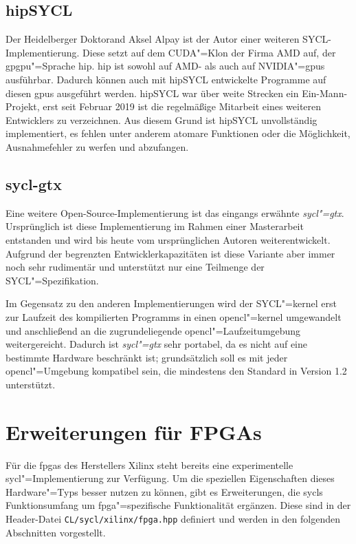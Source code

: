 \subsection{hipSYCL}

Der Heidelberger Doktorand Aksel Alpay ist der Autor einer weiteren
SYCL-Implementierung. Diese setzt auf dem CUDA"=Klon der Firma AMD auf, der
\gls{gpgpu}"=Sprache \gls{hip}. \gls{hip} ist sowohl auf AMD- als auch auf
NVIDIA"=\gls{gpu}s ausführbar. Dadurch können auch mit hipSYCL entwickelte
Programme auf diesen \gls{gpu}s ausgeführt werden. hipSYCL war über weite
Strecken ein Ein-Mann-Projekt, erst seit Februar 2019 ist die regelmäßige
Mitarbeit eines weiteren Entwicklers zu verzeichnen. Aus diesem Grund ist
hipSYCL unvollständig implementiert, es fehlen unter anderem atomare Funktionen
oder die Möglichkeit, Ausnahmefehler zu werfen und abzufangen.
\cite[vgl.][]{hipsycl}

\subsection{sycl-gtx}

Eine weitere Open-Source-Implementierung ist das eingangs erwähnte
\textit{sycl"=gtx}. Ursprünglich ist diese Implementierung im Rahmen einer
Masterarbeit entstanden \cite[vgl.][]{zuzek2016} und wird bis heute vom
ursprünglichen Autoren weiterentwickelt. Aufgrund der begrenzten
Entwicklerkapazitäten ist diese Variante aber immer noch sehr rudimentär und
unterstützt nur eine Teilmenge der SYCL"=Spezifikation.

Im Gegensatz zu den anderen Implementierungen wird der SYCL"=\gls{kernel} erst
zur Laufzeit des kompilierten Programms in einen \gls{opencl}"=\gls{kernel}
umgewandelt und anschließend an die zugrundeliegende
\gls{opencl}"=Laufzeitumgebung weitergereicht. Dadurch ist \textit{sycl"=gtx}
sehr portabel, da es nicht auf eine bestimmte Hardware beschränkt ist;
grundsätzlich soll es mit jeder \gls{opencl}"=Umgebung kompatibel sein, die
mindestens den Standard in Version 1.2 unterstützt. 
\cite[vgl.][47\psqq]{zuzek2016}

\section{Erweiterungen für FPGAs}\label{sycl:erweiterungen}

Für die \gls{fpga}s des Herstellers Xilinx steht bereits eine experimentelle
\gls{sycl}"=Implementierung zur Verfügung. Um die speziellen Eigenschaften
dieses Hardware"=Typs besser nutzen zu können, gibt es Erweiterungen, die
\gls{sycl}s Funktionsumfang um \gls{fpga}"=spezifische Funktionalität ergänzen.
Diese sind in der Header-Datei \texttt{CL/sycl/xilinx/fpga.hpp} definiert und
werden in den folgenden Abschnitten vorgestellt.

